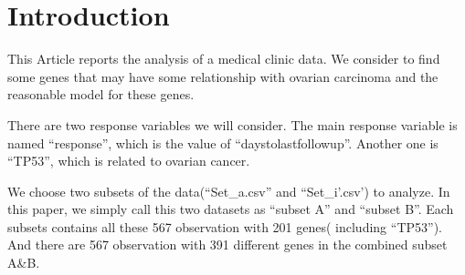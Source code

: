 \documentclass[conference,letterpaper]{IEEEtran}
\begin{document}
\section{\large Introduction}
{\fontsize{11}{13}\selectfont 
This Article reports the analysis of a medical clinic data. We consider to find some genes that may have some relationship with ovarian carcinoma and the reasonable model  for these genes.

There are two response variables we will consider. The main response variable is named ``response'', which is the value of ``daystolastfollowup''. Another one is ``TP53'', which is related to ovarian cancer. 

We choose two subsets of the data(``Set\_a.csv'' and ``Set\_i'.csv')  to analyze. In this paper, we simply call this two datasets as ``subset A'' and ``subset B''. Each subsets contains all these 567 observation with 201 genes( including ``TP53''). And there are 567 observation with 391 different genes in the combined subset A\&B.
}



%
%



%
%
\end{document}
